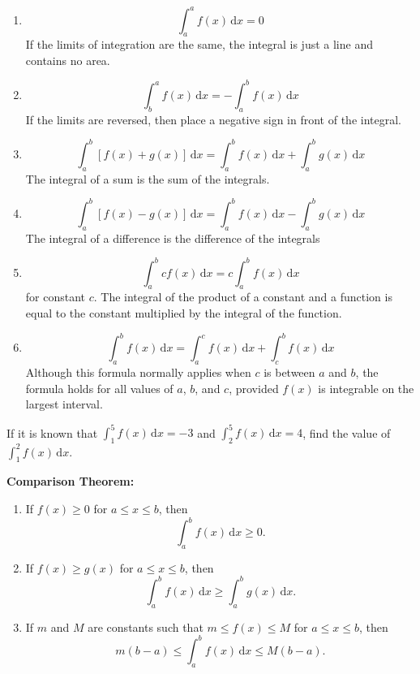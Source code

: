 \begin{enumerate}[sepno]
\item
  \[\int^a_af(x)\,\mathrm{d}x=0\] If the limits of integration are the
  same, the integral is just a line and contains no area.
\item
  \[\int^a_bf(x)\,\mathrm{d}x= - \int^b_af(x)\,\mathrm{d}x\] If the limits
  are reversed, then place a negative sign in front of the integral.
\item
  \[\int^b_a[f(x)+g(x)]\,\mathrm{d}x=\int^b_af(x)\,\mathrm{d}x+\int^b_ag(x)\,\mathrm{d}x\]
  The integral of a sum is the sum of the integrals.
\item
  \[\int^b_a[f(x) - g(x)]\,\mathrm{d}x=\int^b_af(x)\,\mathrm{d}x - \int^b_ag(x)\,\mathrm{d}x\]
  The integral of a difference is the difference of the integrals
\item
  \[\int^b_acf(x)\,\mathrm{d}x=c\int^b_af(x)\,\mathrm{d}x\] for constant
  \(c\). The integral of the product of a constant and a function is
  equal to the constant multiplied by the integral of the function.
\item
  \[\int^b_af(x)\,\mathrm{d}x=\int^c_af(x)\,\mathrm{d}x+\int^b_cf(x)\,\mathrm{d}x\]
  Although this formula normally applies when \(c\) is between \(a\) and
  \(b\), the formula holds for all values of \(a\), \(b\), and \(c\),
  provided \(f(x)\) is integrable on the largest interval.
\end{enumerate}

\begin{example}

If it is known that \(\displaystyle \int^5_1f(x)\,\mathrm{d}x= - 3\) and
\(\displaystyle \int^5_2f(x)\,\mathrm{d}x=4\), find the value of
\(\displaystyle \int^2_1f(x)\,\mathrm{d}x.\)

\end{example}
\vspace*{6\baselineskip}

\begin{theorem}

\textbf{Comparison Theorem:}

\begin{enumerate}[sepno]
\item
  If \(f(x) \ge 0\) for \(a \le x \le b\), then \[\int^b_af(x)\,\mathrm{d}x \ge 0.\]
\item
  If \(f(x) \ge g(x)\) for \(a \le x \le b\), then
  \[\int^b_af(x)\,\mathrm{d}x \ge \int^b_ag(x)\,\mathrm{d}x.\]
\item
  If \(m\) and \(M\) are constants such that \(m \le f(x) \le M\) for \(a \le x \le b\),
  then \[m(b - a) \le \int^b_af(x)\,\mathrm{d}x \le M(b - a).\]
\end{enumerate}

\end{theorem}

